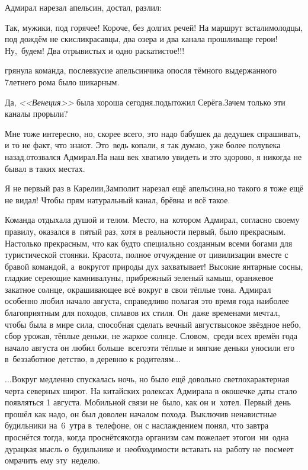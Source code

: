 Адмирал нарезал апельсин, достал, разлил: 

\diagdash Так, мужики, под горячее! Короче, без долгих речей! На маршрут встали\mdash молодцы, под дождём не скисли\mdash красавцы, два озера и два канала прошли\mdash ваще герои! Ну,~будем! Два отрывистых и одно раскатистое!!!

\mdash грянула команда, послевкусие апельсинчика опосля тёмного выдержанного 7\sdash летнего рома было шикарным.

\diagdash Да, \textit{<<Венеция>>} была хороша сегодня.\mdash подытожил Серёга.\mdash Зачем только эти каналы прорыли?

\diagdash Мне тоже интересно, но, скорее всего, это надо бабушек да дедушек спрашивать, и то не факт, что знают. Это~ведь копали, я так думаю, уже более полувека назад.\mdash отозвался Адмирал.\mdash На наш век хватило увидеть и это здорово, я никогда не бывал в таких местах.

\diagdash Я не первый раз в Карелии,\mdash Замполит нарезал ещё апельсина,\mdash но такого я тоже ещё не видал! Чтобы прям натуральный канал, брёвна и всё такое.%

Команда отдыхала душой и телом. Место, на~котором Адмирал, согласно своему правилу, оказался в~пятый раз, хотя в реальности первый, было прекрасным. Настолько прекрасным, что как будто специально созданным всеми богами для туристической стоянки. Красота, полное отчуждение от цивилизации вместе с бравой командой, а~вокруг\mdash от природы дух захватывает! Высокие янтарные сосны, гладкие сереющие камни\sdash валуны, прибрежный зеленый камыш, оранжевое закатное солнце, окрашивающее всё вокруг в свои тёплые тона. Адмирал особенно любил начало августа, справедливо полагая это время года наиболее благоприятным для походов, сплавов их стиля. Он~даже временами мечтал, чтобы была в мире сила, способная сделать вечный август\mdash высокое звёздное небо, сбор урожая, тёплые деньки, не жаркое солнце. Словом,~среди всех времён года начало августа он любил больше~всего\mdash эти тёплые и мягкие деньки уносили его в~беззаботное детство, в деревню к родителям$\ldots$

\vspace{0.5cm}
$\ldots$Вокруг медленно спускалась ночь, но было ещё довольно светло\mdash характерная черта северных широт. На китайских ролексах Адмирала в окошечке даты стало появляться 1 августа. Мобильной связи не~было, как он и~хотел. Первый день прошёл как надо, он был доволен началом похода. Выключив ненавистные будильники на~6~утра в~телефоне, он с наслаждением понял, что завтра проснётся тогда, когда проснётся\mdash когда организм сам пожелает этого\mdash и~ни~одна дурацкая мысль о~будильнике и~необходимости вставать на~работу не~посмеет омрачить ему эту~неделю. 

\begin{center}
\end{center}
